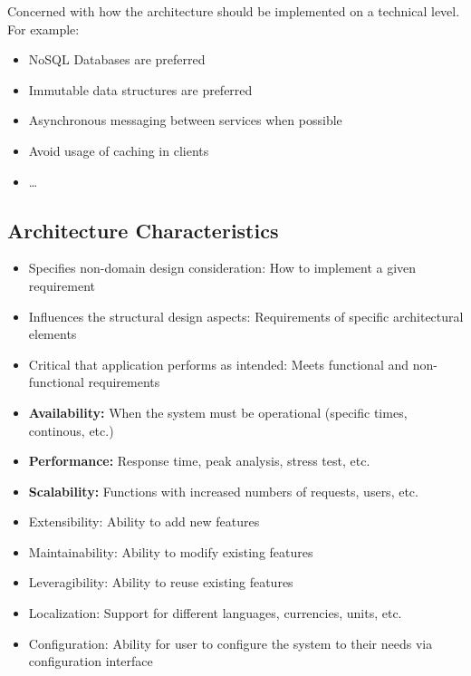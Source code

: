 \documentclass[
../../Software_Engineering_Summary.tex,
]
{subfiles}
\begin{document}
\begin{defbox}
    Concerned with how the architecture should be implemented on a technical level. For example:
    \begin{itemize}
        \item NoSQL Databases are preferred
        \item Immutable data structures are preferred
        \item Asynchronous messaging between services when possible
        \item Avoid usage of caching in clients
        \item \dots
    \end{itemize}
\end{defbox}

\subsection{Architecture Characteristics}
\begin{itemize}
    \item Specifies non-domain design consideration: How to implement a given requirement
    \item Influences the structural design aspects: Requirements of specific architectural elements
    \item Critical that application performs as intended: Meets functional and non-functional requirements
\end{itemize}

\begin{defbox}
    \begin{itemize}
        \item \textbf{Availability:} When the system must be operational (specific times, continous, etc.)
        \item \textbf{Performance:} Response time, peak analysis, stress test, etc.
        \item \textbf{Scalability:} Functions with increased numbers of requests, users, etc. 
    \end{itemize}
\end{defbox}

\begin{defbox}
    \begin{itemize}
        \item Extensibility: Ability to add new features
        \item Maintainability: Ability to modify existing features
        \item Leveragibility: Ability to reuse existing features
        \item Localization: Support for different languages, currencies, units, etc.
        \item Configuration: Ability for user to configure the system to their needs via configuration interface
    \end{itemize}
\end{defbox}
\end{document}
